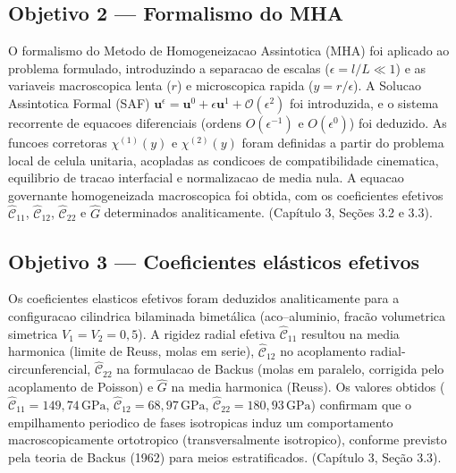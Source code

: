 \subsection{Objetivo 2 — Formalismo do MHA}
O formalismo do Metodo de Homogeneizacao Assintotica (MHA) foi aplicado ao problema formulado, introduzindo a separacao de escalas ($\epsilon = l/L \ll 1$) e as variaveis macroscopica lenta ($r$) e microscopica rapida ($y = r/\epsilon$). A Solucao Assintotica Formal (SAF) $\mathbf{u}^\epsilon = \mathbf{u}^0 + \epsilon \mathbf{u}^1 + \mathcal{O}(\epsilon^2)$ foi introduzida, e o sistema recorrente de equacoes diferenciais (ordens $O(\epsilon^{-1})$ e $O(\epsilon^0)$) foi deduzido. As funcoes corretoras $\chi^{(1)}(y)$ e $\chi^{(2)}(y)$ foram definidas a partir do problema local de celula unitaria, acopladas as condicoes de compatibilidade cinematica, equilibrio de tracao interfacial e normalizacao de media nula. A equacao governante homogeneizada macroscopica foi obtida, com os coeficientes efetivos $\hat{\mathcal{C}}_{11}$, $\hat{\mathcal{C}}_{12}$, $\hat{\mathcal{C}}_{22}$ e $\hat{G}$ determinados analiticamente. (Capítulo 3, Seções 3.2 e 3.3).

\subsection{Objetivo 3 — Coeficientes elásticos efetivos}
Os coeficientes elasticos efetivos foram deduzidos analiticamente para a configuracao cilindrica bilaminada bimetálica (aco--aluminio, fracão volumetrica simetrica $V_1 = V_2 = 0,5$). A rigidez radial efetiva $\hat{\mathcal{C}}_{11}$ resultou na media harmonica (limite de Reuss, molas em serie), $\hat{\mathcal{C}}_{12}$ no acoplamento radial-circunferencial, $\hat{\mathcal{C}}_{22}$ na formulacao de Backus (molas em paralelo, corrigida pelo acoplamento de Poisson) e $\hat{G}$ na media harmonica (Reuss). Os valores obtidos ($\hat{\mathcal{C}}_{11} = 149{,}74\,\text{GPa}$, $\hat{\mathcal{C}}_{12} = 68{,}97\,\text{GPa}$, $\hat{\mathcal{C}}_{22} = 180{,}93\,\text{GPa}$) confirmam que o empilhamento periodico de fases isotropicas induz um comportamento macroscopicamente ortotropico (transversalmente isotropico), conforme previsto pela teoria de Backus (1962) para meios estratificados. (Capítulo 3, Seção 3.3).

